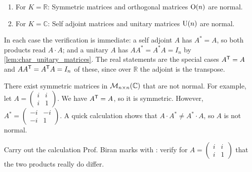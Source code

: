 \begin{example}
\begin{enumerate}[label=\textbf{(\alph*)}]
    \item For $K = \mathbb{R}$: Symmetric matrices and orthogonal matrices $\operatorname{O}(n)$ are normal.
    \item For $K = \mathbb{C}$: Self adjoint matrices and unitary matrices $\operatorname{U}(n)$ are normal.
\end{enumerate}
In each case the verification is immediate: a self adjoint $A$ has $A^* = A$, so both products read $A \cdot A$; and a unitary $A$ has $A A^* = A^* A = I_n$ by \cref{lem:char_unitary_matrices}. The real statements are the special cases $A^{\mathsf{T}} = A$ and $A A^{\mathsf{T}} = A^{\mathsf{T}} A = I_n$ of these, since over $\mathbb{R}$ the adjoint is the transpose.
\end{example}

\begin{remark}
There exist symmetric matrices in $\mathcal{M}_{n \times n}(\mathbb{C})$ that are not normal. For example, let $A = \left(\begin{smallmatrix} i & i \\ i & 1 \end{smallmatrix}\right)$. We have $A^{\mathsf{T}} = A$, so it is symmetric. However, $A^* = \left(\begin{smallmatrix} -i & -i \\ -i & 1 \end{smallmatrix}\right)$. A quick calculation shows that $A \cdot A^* \neq A^* \cdot A$, so $A$ is not normal.
\end{remark}

\begin{exercise}
\label{exc:symmetric_not_normal}
Carry out the calculation Prof. Biran marks with : verify for $A = \left(\begin{smallmatrix} i & i \\ i & 1 \end{smallmatrix}\right)$ that the two products really do differ.
\end{exercise}

